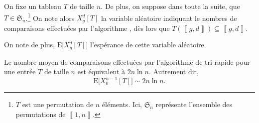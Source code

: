 \begin{rmk}[Notations]
	On fixe un tableau $T$\/ de taille $n$. De plus, on suppose dans toute la suite, que $T \in \mathfrak{S}_n$.\footnote{$T$\/ est une permutation de $n$\/ éléments. Ici, $\mathfrak{S}_n$\/ représente l'ensemble des permutations de $\left\llbracket 1,n \right\rrbracket$.} On note alors $X_g^d[T]$\/ la variable aléatoire indiquant le nombres de comparaisons effectuées par l'algorithme , dès lors que $T(\left\llbracket g,d \right\rrbracket) \subseteq \left\llbracket g,d \right\rrbracket$.

	\noindent On note de plus, $\mathrm{E}\big[X^d_g[T]\big]$\/ l'espérance de cette variable aléatoire.
\end{rmk}

\begin{thm}
	Le nombre moyen de comparaisons effectuées par l'algorithme de tri rapide pour une entrée $T$\/ de taille $n$\/ est équivalent à $2n \ln n$. Autrement dit, \[
		\mathrm{E}\big[X_0^{n-1}[T]\big] \sim 2n \ln n
	.\]
\end{thm}

